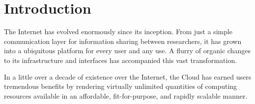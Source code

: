 \section{Introduction}
\label{sec:introduction}

The Internet has evolved enormously since its inception. From just a simple communication layer for information sharing between researchers, it has grown into a ubiquitous platform for every user and any use. 
A flurry of organic changes to its infrastructure and interfaces has accompanied this vast transformation.

In a little over a decade of existence over the Internet, the Cloud \cite{mell2011nist} has earned users tremendous benefits by rendering virtually unlimited quantities of computing resources available in an affordable, fit-for-purpose, and rapidly scalable manner.

